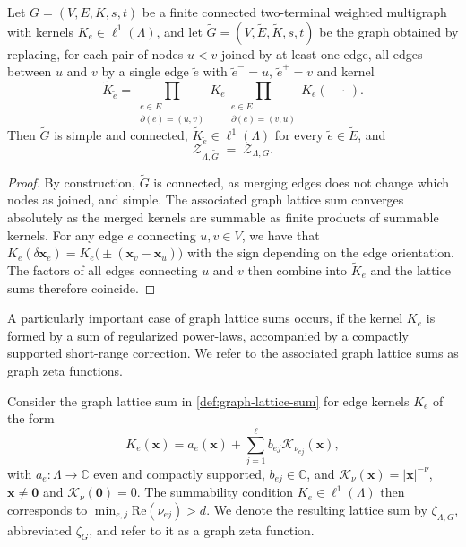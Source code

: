 \documentclass[]{amsart}
\numberwithin{mythm}{section}
\begin{document}
\begin{lemma}
\label{lem:merge}
Let $G=(V,E,K,s,t)$ be a finite connected two-terminal weighted multigraph with kernels $K_e\in\ell^1(\Lambda)$, and let $\tilde G=(V,\tilde E,\tilde K,s,t)$ be the graph obtained by replacing, for each pair of nodes $u<v$ joined by at least one edge, all edges between $u$ and $v$ by a single edge $\tilde e$ with
$\tilde e^-=u$, $\tilde e^+=v$ and kernel
\[
\tilde K_{\tilde e}
=
\prod_{\substack{e\in E\\ \partial(e)=(u,v)}} K_e
\prod_{\substack{e\in E\\ \partial(e)=(v,u)}} K_e(-\,\cdot\,).
\]
Then $\tilde G$ is simple and connected,
$\tilde K_{\tilde e}\in\ell^1(\Lambda)$ for every $\tilde e\in\tilde E$, and
\[
\mathcal Z_{\Lambda,\tilde G}\;=\;\mathcal Z_{\Lambda,G}.
\]
\end{lemma}
\begin{proof}
    By construction, $\tilde G$ is connected, as merging edges does not change which nodes as joined, and simple. The associated graph lattice sum converges absolutely as the merged kernels are summable as finite products of summable kernels. For any edge $e$ connecting $u,v\in V$, we have that 
    $K_e(\delta\bm x_{e})=K_e\big(\pm(\bm x_{v}-\bm x_{u})\big)$ with the sign depending on the edge orientation. The factors of all edges connecting $u$ and $v$ then combine into $\tilde K_e$ and the lattice sums therefore coincide.
\end{proof}

A particularly important case of graph lattice sums occurs, if the kernel $K_e$ is formed by a sum of regularized power-laws, accompanied by a compactly supported short-range correction. We refer to the associated graph lattice sums as graph zeta functions.

\begin{definition}
    \label{def:graph_zeta_functions}
   Consider the graph lattice sum in \cref{def:graph-lattice-sum} for edge kernels $K_e$ of the form
    \[
    K_e(\bm x) = a_e(\bm x) +\sum_{j=1}^\ell b_{ej}\mathcal K_{\nu_{ej}}(\bm x),
    \]
    with $a_e:\Lambda\to \mathds C$ even and compactly supported, $b_{ej}\in \mathds C$, and $\mathcal{K}_{\nu}(\bm x) = \vert \bm x\vert^{-\nu}$, $\bm x\neq \bm 0$ and $\mathcal K_{\nu}(\bm 0)=0$.
    The summability condition $K_e\in\ell^1(\Lambda)$ then corresponds to $\min_{e,j}\mathrm{Re}(\nu_{ej})>d$. We denote the resulting lattice sum by $\zeta_{\Lambda,G}$, abbreviated $\zeta_G$, and
    refer to it as a graph zeta function.
\end{definition}
\end{document}
